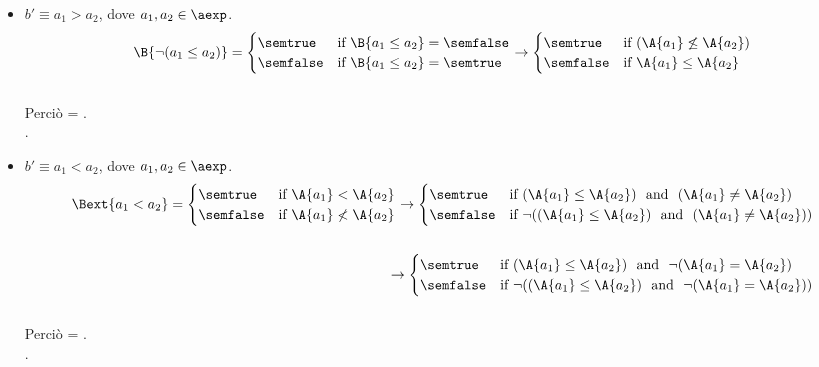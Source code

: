 {\begin{enumerate}[label=(\alph*)]
\begin{itemize}
    \item $ b' \equiv a_1 > a_2$, dove $a_1, a_2 \in \aexp$. \\
      \begin{align*} 
       \B{\lnot(a_1 \leq a_2)} = 
        \begin{cases}
        \semtrue &
        \mbox{if} \ \B{a_1 \leq a_2} = \semfalse \\
        \semfalse & 
        \mbox{if} \ \B{a_1 \leq a_2} = \semtrue \\
        \end{cases} 
        \rightarrow
        \begin{cases} 
        \semtrue & 
        \mbox{if} \ (\A{a_1} \not \leq \A{a_2})\\ 
        \semfalse & 
        \mbox{if} \ \A{a_1} \leq \A{a_2}\\
        \end{cases} 
      \end{align*} \\
      Perciò  = . \\.

    \item $ b' \equiv a_1 < a_2$, dove $a_1, a_2 \in \aexp$. \\
      \begin{align*}
        \Bext{a_1 < a_2} = 
        \begin{cases} 
        \semtrue & 
        \mbox{if} \ \A{a_1} < \A{a_2}\\ 
        \semfalse & 
        \mbox{if} \ \A{a_1} \not < \A{a_2}\\
        \end{cases}
        \rightarrow
        \begin{cases} 
        \semtrue & 
        \mbox{if} \ (\A{a_1} \leq \A{a_2}) \ \mbox{ and } \ (\A{a_1} \not =  \A{a_2})\\ 
        \semfalse & 
        \mbox{if} \ \lnot ((\A{a_1} \leq \A{a_2}) \ \mbox{ and } \ (\A{a_1} \not =  \A{a_2}))\\
        \end{cases} \\ \\
        \rightarrow
        \begin{cases} 
        \semtrue & 
        \mbox{if} \ (\A{a_1} \leq \A{a_2}) \ \mbox{ and } \ \lnot (\A{a_1} =  \A{a_2})\\ 
        \semfalse & 
        \mbox{if} \ \lnot ((\A{a_1} \leq \A{a_2}) \ \mbox{ and } \ \lnot (\A{a_1} = \A{a_2}))\\
        \end{cases}
      \end{align*} \\
      Perciò  =
      . \\.


\end{itemize}
\end{enumerate}}
